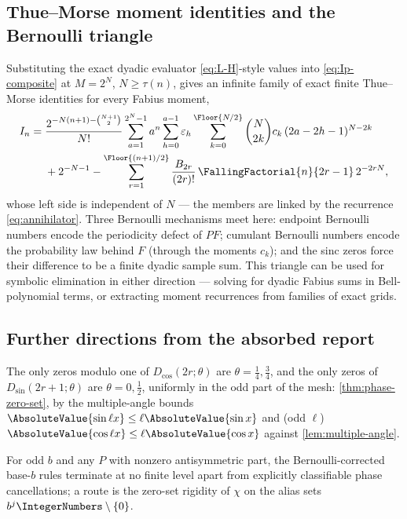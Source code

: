 \subsection{Thue--Morse moment identities and the Bernoulli triangle}

Substituting the exact dyadic evaluator \eqref{eq:L-H}-style values
into \eqref{eq:Ip-composite} at $M=2^{N}$, $N\ge\tau(n)$, gives an
infinite family of exact finite Thue--Morse identities for every
Fabius moment,
\begin{align}
 I_n
 ={}&\frac{2^{-N(n+1)-\binom{N+1}2}}{N!}
 \sum_{a=1}^{2^{N}-1}a^{n}
 \sum_{h=0}^{a-1}\eps_h
 \sum_{k=0}^{\Floor{N/2}}\binom N{2k}c_k\,(2a-2h-1)^{N-2k}
 \notag\\
 &+2^{-N-1}
 -\sum_{r=1}^{\Floor{(n+1)/2}}
 \frac{B_{2r}}{(2r)!}\,\FallingFactorial{n}{2r-1}\,2^{-2rN},
 \label{eq:In-TM-family}
\end{align}
whose left side is independent of $N$ --- the members are linked by the
recurrence \eqref{eq:annihilator}.  Three Bernoulli mechanisms meet
here: endpoint Bernoulli numbers encode the periodicity defect of
$PF$; cumulant Bernoulli numbers encode the probability law behind $F$
(through the moments $c_k$); and the sinc zeros force their difference
to be a finite dyadic sample sum.  This triangle can be used for
symbolic elimination in either direction --- solving for dyadic Fabius
sums in Bell-polynomial terms, or extracting moment recurrences from
families of exact grids.

\subsection{Further directions from the absorbed report}

\begin{remark}
\label{conj:F-phase-zeros}
The only zeros modulo one of $D_{\cos}(2r;\theta)$ are
$\theta=\tfrac14,\tfrac34$, and the only zeros of
$D_{\sin}(2r+1;\theta)$ are $\theta=0,\tfrac12$, uniformly in the
odd part of the mesh: \cref{thm:phase-zero-set}, by the multiple-angle
bounds $\AbsoluteValue{\sin\ell x}\le\ell\AbsoluteValue{\sin x}$ and (odd $\ell$)
$\AbsoluteValue{\cos\ell x}\le\ell\AbsoluteValue{\cos x}$ against
\cref{lem:multiple-angle}.
\end{remark}

\begin{conjecture}
\label{conj:odd-base}
For odd $b$ and any $P$ with nonzero antisymmetric part, the
Bernoulli-corrected base-$b$ rules terminate at no finite level apart
from explicitly classifiable phase cancellations; a route is the
zero-set rigidity of $\chi$ on the alias sets
$b^{j}\IntegerNumbers\setminus\{0\}$.
\end{conjecture}

